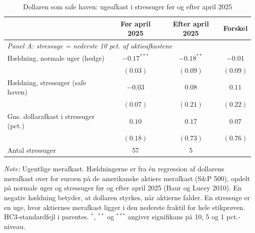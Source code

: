 \begin{table}[H]
\centering
\caption{Dollaren som safe haven: ugeafkast i stressuger før og efter april 2025}
\label{tab:campbell_safehaven}
\begin{threeparttable}
\begin{tabular}{l ccc}
\toprule
 & Før april 2025 & Efter april 2025 & Forskel \\
\midrule
\multicolumn{4}{l}{\textit{Panel A: stressuge = nederste 10 pct. af aktieafkastene}} \\
Hældning, normale uger (hedge) & $-0.17^{***}$ & $-0.18^{**}$ & $-0.01$ \\
 & $(0.03)$ & $(0.09)$ & $(0.09)$ \\
Hældning, stressuger (safe haven) & $-0.03$ & $0.08$ & $0.11$ \\
 & $(0.07)$ & $(0.21)$ & $(0.22)$ \\
Gns. dollarafkast i stressuger (pct.) & $0.10$ & $0.17$ & $0.07$ \\
 & $(0.18)$ & $(0.73)$ & $(0.76)$ \\
Antal stressuger & 57 & 5 & \\[4pt]
\bottomrule
\end{tabular}
\begin{tablenotes}[flushleft]\footnotesize
\item \textit{Note:} Ugentlige merafkast. Hældningerne er fra én regression af dollarens merafkast over for euroen på de amerikanske aktiers merafkast (S\&P 500), opdelt på normale uger og stressuger før og efter april 2025 (Baur og Lucey 2010). En negativ hældning betyder, at dollaren styrkes, når aktierne falder. En stressuge er en uge, hvor aktiernes merafkast ligger i den nederste fraktil for hele stikprøven. HC3-standardfejl i parentes. $^{*}$, $^{**}$ og $^{***}$ angiver signifikans på 10, 5 og 1 pct.-niveau.
\end{tablenotes}
\end{threeparttable}
\end{table}